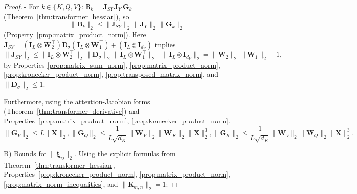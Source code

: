 \documentclass{article}
\begin{document}
\begin{proof}
- For $k\in\{K,Q,V\}$: $\mathbf{B}_k = \mathbf{J}_{SY}\, \mathbf{J}_Y \,\mathbf{G}_k$ (Theorem~\ref{thm:transformer_hessian}), so
\begin{equation}\label{eq:Bk_norm}
\|\mathbf{B}_k\|_2 \le \|\mathbf{J}_{SY}\|_2 \, \|\mathbf{J}_Y\|_2 \, \|\mathbf{G}_k\|_2
\end{equation}
(Property~\ref{prop:matrix_product_norm}).
Here $\mathbf{J}_{SY} = (\mathbf{I}_L \otimes \mathbf{W}_2^\top)\mathbf{D}_\sigma(\mathbf{I}_L \otimes \mathbf{W}_1^\top) + (\mathbf{I}_L \otimes \mathbf{I}_{d_V})$ implies
\begin{equation}\label{eq:JSY_norm}
\|\mathbf{J}_{SY}\|_2 \le \|\mathbf{I}_L \otimes \mathbf{W}_2^\top\|_2 \,\|\mathbf{D}_\sigma\|_2 \,\|\mathbf{I}_L \otimes \mathbf{W}_1^\top\|_2 + \|\mathbf{I}_L \otimes \mathbf{I}_{d_V}\|_2
= \|\mathbf{W}_2\|_2 \,\|\mathbf{W}_1\|_2 + 1,
\end{equation}
by Properties~\ref{prop:matrix_sum_norm}, \ref{prop:matrix_product_norm}, \ref{prop:kronecker_product_norm}, \ref{prop:transposed_matrix_norm}, and $\|\mathbf{D}_\sigma\|_2 \le 1$.

Furthermore, using the attention-Jacobian forms (Theorem~\ref{thm:transformer_derivative}) and Properties~\ref{prop:matrix_product_norm}, \ref{prop:kronecker_product_norm}:
\begin{equation}\label{eq:Gk_bounds}
\|\mathbf{G}_V\|_2 \le L \|\mathbf{X}\|_2,
\|\mathbf{G}_Q\|_2 \le \frac{1}{L\sqrt{d_K}} \|\mathbf{W}_V\|_2 \|\mathbf{W}_K\|_2 \|\mathbf{X}\|_2^3,
\|\mathbf{G}_K\|_2 \le \frac{1}{L\sqrt{d_K}} \|\mathbf{W}_V\|_2 \|\mathbf{W}_Q\|_2 \|\mathbf{X}\|_2^3.
\end{equation}

B) Bounds for $\|\boldsymbol{\xi}_{ij}\|_2$.
Using the explicit formulas from Theorem~\ref{thm:transformer_hessian}, Properties~\ref{prop:kronecker_product_norm}, \ref{prop:matrix_product_norm}, \ref{prop:matrix_norm_inequalities}, and $\|\mathbf{K}_{m,n}\|_2=1$:


\end{proof}
\end{document}
